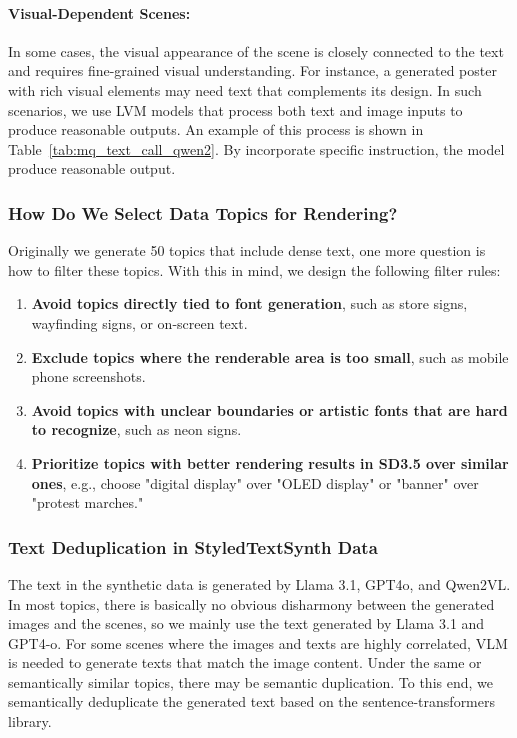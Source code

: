 \paragraph{Visual-Dependent Scenes:}  
In some cases, the visual appearance of the scene is closely connected to the text and requires fine-grained visual understanding. 
For instance, a generated poster with rich visual elements may need text that complements its design. 
In such scenarios, we use LVM models that process both text and image inputs to produce reasonable outputs. 
An example of this process is shown in Table~\ref{tab:mq_text_call_qwen2}.
By incorporate specific instruction, the model produce reasonable output.



\subsubsection{How Do We Select Data Topics for Rendering?}
Originally we generate 50 topics that include dense text, one more question is how to filter these topics.
With this in mind, we design the following filter rules:
\begin{enumerate}
    \item \textbf{Avoid topics directly tied to font generation}, such as store signs, wayfinding signs, or on-screen text.
    \item \textbf{Exclude topics where the renderable area is too small}, such as mobile phone screenshots.
    \item \textbf{Avoid topics with unclear boundaries or artistic fonts that are hard to recognize}, such as neon signs.
    \item \textbf{Prioritize topics with better rendering results in SD3.5 over similar ones}, e.g., choose "digital display" over "OLED display" or "banner" over "protest marches."
\end{enumerate}



\subsubsection{Text Deduplication in StyledTextSynth Data}
The text in the synthetic data is generated by Llama 3.1, GPT4o, and Qwen2VL. 
In most topics, there is basically no obvious disharmony between the generated images and the scenes, so we mainly use the text generated by Llama 3.1 and GPT4-o. 
For some scenes where the images and texts are highly correlated, VLM is needed to generate texts that match the image content.
Under the same or semantically similar topics, there may be semantic duplication. To this end, we semantically deduplicate the generated text based on the sentence-transformers library. 

